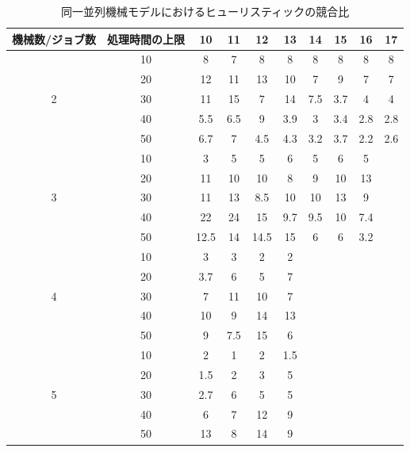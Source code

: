 \documentclass[12pt]{optlab-bachelor}
\begin{document}
\begin{table}[htb]
  \begin{center}
    \begin{tabular}{|c|c|c|c|c|c|c|c|c|c|} \hline
      機械数/ジョブ数 & 処理時間の上限 & 10 & 11 & 12 & 13 & 14 & 15 & 16 & 17 \\ \hline \hline
      & 10 & 8 & 7 & 8 & 8 & 8 & 8 & 8 & 8 \\ \cline{2-10}
      & 20 & 12 & 11 & 13 & 10 & 7 & 9 & 7 & 7 \\ \cline{2-10}
      2 & 30 & 11 & 15 & 7 & 14 & 7.5 & 3.7 & 4 & 4 \\ \cline{2-10}
      & 40 & 5.5 & 6.5 & 9 & 3.9 & 3 & 3.4 & 2.8 & 2.8 \\ \cline{2-10}
      & 50 & 6.7 & 7 & 4.5 & 4.3 & 3.2 & 3.7 & 2.2 & 2.6 \\ \hline \hline
      & 10 & 3 & 5 & 5 & 6 & 5 & 6 & 5 &  \\ \cline{2-10}
      & 20 & 11 & 10 & 10 & 8 & 9 & 10 & 13 &  \\ \cline{2-10}
      3 & 30 & 11 & 13 & 8.5 & 10 & 10 & 13 & 9 &  \\ \cline{2-10}
      & 40 & 22 & 24 & 15 & 9.7 & 9.5 & 10 & 7.4 &  \\ \cline{2-10}
      & 50 & 12.5 & 14 & 14.5 & 15 & 6 & 6 & 3.2 &  \\ \hline \hline
      & 10 & 3 & 3 & 2 & 2 &  &  &  & \\ \cline{2-10}
      & 20 & 3.7 & 6 & 5 & 7 &  &  &  &  \\ \cline{2-10}
      4 & 30 & 7 & 11 & 10 & 7 &  &  &  &  \\ \cline{2-10}
      & 40 & 10 & 9 & 14 & 13 &  &  &  &  \\ \cline{2-10}
      & 50 & 9 & 7.5 & 15 & 6 &  &  &  &  \\ \hline \hline
      & 10 & 2 & 1 & 2 & 1.5 &  &  &  &  \\ \cline{2-10}
      & 20 & 1.5 & 2 & 3 & 5 &  &  &  &  \\ \cline{2-10}
      5 & 30 & 2.7 & 6 & 5 & 5 &  &  &  &  \\ \cline{2-10}
      & 40 & 6 & 7 & 12 & 9 &  &  &  &  \\ \cline{2-10}
      & 50 & 13 & 8 & 14 & 9 &  &  &  &  \\ \hline \hline
    \end{tabular}
    \caption{同一並列機械モデルにおけるヒューリスティックの競合比}
  \end{center}
\end{table}
\end{document}
